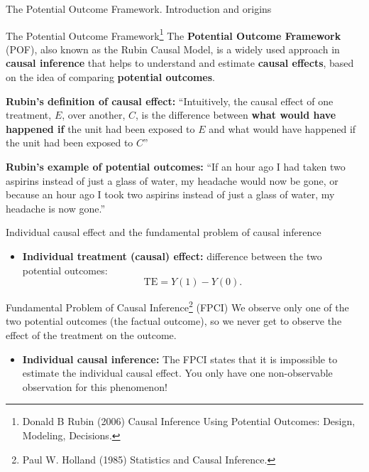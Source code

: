 \documentclass[aspectratio=169]{beamer}
\begin{document}
\begin{frame}{The Potential Outcome Framework. Introduction and origins}

\begin{coolblock}{The Potential Outcome Framework\footnote{\scriptsize Donald B Rubin (2006) Causal Inference Using Potential Outcomes: Design, Modeling, Decisions.}}
    The \textbf{Potential Outcome Framework} (POF), also known as the Rubin Causal Model, is a widely used approach in \textbf{causal inference} that helps to understand and estimate \textbf{causal effects}, based on the idea of comparing \textbf{potential outcomes}.
\end{coolblock}
\vspace{0.2cm}

\textbf{Rubin's definition of causal effect:} ``Intuitively, the causal effect of one treatment, $E$, over another, $C$, is the difference between \textbf{what would have happened if} the unit had been exposed to $E$ and what would have happened if the unit had been exposed to $C$'' 
\vspace{0.3cm}

\textbf{Rubin's example of potential outcomes:} ``If an hour ago I had taken two aspirins instead of just a glass of water, my headache would now be gone, or because an hour ago I took two aspirins instead of just a glass of water, my headache is now gone.''

\end{frame}

\begin{frame}{Individual causal effect and the fundamental problem of causal inference}


\begin{itemize}
    \item \textbf{Individual treatment (causal) effect:} difference between the two potential outcomes: $$\mathrm{TE} = Y(1) - Y(0).$$
\end{itemize}

\begin{coolblock}{Fundamental Problem of Causal Inference\footnote{\scriptsize Paul W. Holland (1985) Statistics and Causal Inference.} (FPCI)}
    We observe only one of the two potential outcomes (the factual outcome), so we never get to observe the effect of the treatment on the outcome.
\end{coolblock}
\vspace{0.2cm}

\begin{itemize}
    \item \textbf{Individual causal inference:} The FPCI states that it is impossible to estimate the individual causal effect. You only have one non-observable observation for this phenomenon!
\end{itemize}

\end{frame}
\end{document}

